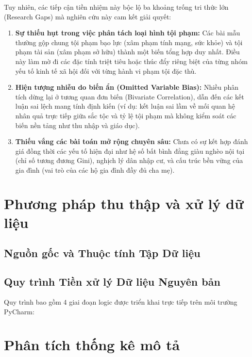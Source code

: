 \documentclass[conference]{IEEEtran}
\begin{document}
Tuy nhiên, các tiếp cận tiền nhiệm này bộc lộ ba khoảng trống tri thức lớn (Research Gaps) mà nghiên cứu này cam kết giải quyết:
\begin{enumerate}
    \item \textbf{Sự thiếu hụt trong việc phân tách loại hình tội phạm:} Các bài mẫu thường gộp chung tội phạm bạo lực (xâm phạm tính mạng, sức khỏe) và tội phạm tài sản (xâm phạm sở hữu) thành một biến tổng hợp duy nhất. Điều này làm mờ đi các đặc tính triệt tiêu hoặc thúc đẩy riêng biệt của từng nhóm yếu tố kinh tế xã hội đối với từng hành vi phạm tội đặc thù.
    \item \textbf{Hiện tượng nhiễu do biến ẩn (Omitted Variable Bias):} Nhiều phân tích dừng lại ở tương quan đơn biến (Bivariate Correlation), dẫn đến các kết luận sai lệch mang tính định kiến (ví dụ: kết luận sai lầm về mối quan hệ nhân quả trực tiếp giữa sắc tộc và tỷ lệ tội phạm mà không kiểm soát các biến nền tảng như thu nhập và giáo dục).
    \item \textbf{Thiếu vắng các bài toán mở rộng chuyên sâu:} Chưa có sự kết hợp đánh giá đồng thời các yếu tố hiện đại như hệ số bất bình đẳng giàu nghèo nội tại (chỉ số tương đương Gini), nghịch lý dân nhập cư, và cấu trúc bền vững của gia đình (vai trò của các hộ gia đình đầy đủ cha mẹ).

\end{enumerate}

\section{Phương pháp thu thập và xử lý dữ liệu}

\subsection{Nguồn gốc và Thuộc tính Tập Dữ liệu}

\subsection{Quy trình Tiền xử lý Dữ liệu Nguyên bản}

Quy trình bao gồm 4 giai đoạn logic được triển khai trực tiếp trên môi trường PyCharm:

\section{Phân tích thống kê mô tả}
\end{document}
